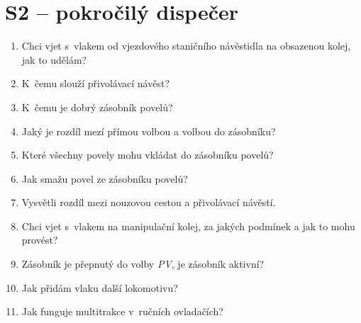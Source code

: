 \documentclass[12pt,a4paper]{article}
\begin{document}
\newpage
\section*{S2 – pokročilý dispečer}

\begin{enumerate}[leftmargin=*]
\item Chci vjet s~vlakem od vjezdového staničního návěstidla na obsazenou
kolej, jak to udělám?

\item K~čemu slouží přivolávací návěst?

\item K~čemu je dobrý zásobník povelů?

\item Jaký je rozdíl mezí přímou volbou a volbou do zásobníku?

\item Které všechny povely mohu vkládat do zásobníku povelů?

\item Jak smažu povel ze zásobníku povelů?

\item Vysvětli rozdíl mezi nouzovou cestou a přivolávací návěstí.

\item Chci vjet s~vlakem na manipulační kolej, za jakých podmínek a jak to mohu
provést?

\item Zásobník je přepnutý do volby \textit{PV}, je zásobník aktivní?

\item Jak přidám vlaku další lokomotivu?

\item Jak funguje multitrakce v~ručních ovladačích?

\end{enumerate}
\end{document}
